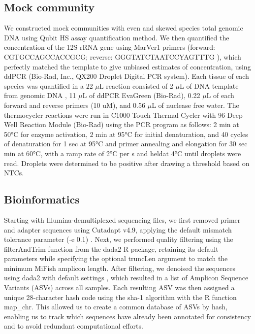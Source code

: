 \documentclass[9pt,twoside,lineno]{pnas-SI}
\begin{document}
\subsection*{Mock community}

We constructed mock communities with even and skewed species total genomic DNA using Qubit HS assay quantification method. We then quantified the concentration of the 12S rRNA gene using MarVer1 primers (forward: CGTGCCAGCCACCGCG; reverse: GGGTATCTAATCCYAGTTTG \cite{valsecchi2020}), which perfectly matched the template to give unbiased estimates of concentration, using ddPCR (Bio-Rad, Inc., QX200 Droplet Digital PCR system). Each tissue of each species was quantified in a 22 $\mu$L reaction consisted of 2 $\mu$L of DNA template from genomic DNA , 11 $\mu$L of ddPCR EvaGreen (Bio-Rad), 0.22 $\mu$L of each forward and reverse primers (10 uM), and 0.56 $\mu$L of nuclease free water. The thermocycler reactions were run in C1000 Touch Thermal Cycler with 96-Deep Well Reaction Module (Bio-Rad) using the PCR program as follows: 2 min at 50°C for enzyme activation, 2 min at 95°C for initial denaturation, and 40 cycles of denaturation for 1 sec at 95°C and primer annealing and elongation for 30 sec min at 60°C, with a ramp rate of 2°C per s and heldat 4°C until droplets were read. Droplets were determined to be positive after drawing a threshold based on NTCs.

\subsection*{Bioinformatics}
Starting with Illumina-demultiplexed sequencing files, we first removed primer and adapter sequences using Cutadapt v4.9, applying the default mismatch tolerance parameter (-e 0.1) \cite{martin2011}. Next, we performed quality filtering using the filterAndTrim function from the dada2 R package, retaining its default parameters while specifying the optional truncLen argument to match the minimum MiFish amplicon length. After filtering, we denoised the sequences using dada2 with default settings \cite{callahan2016}, which resulted in a list of Amplicon Sequence Variants (ASVs) across all samples. Each resulting ASV was then assigned a unique 28-character hash code using the sha-1 algorithm with the R function map\_chr. This allowed us to create a common database of ASVs by hash, enabling us to track which sequences have already been annotated for consistency and to avoid redundant computational efforts.
\end{document}
